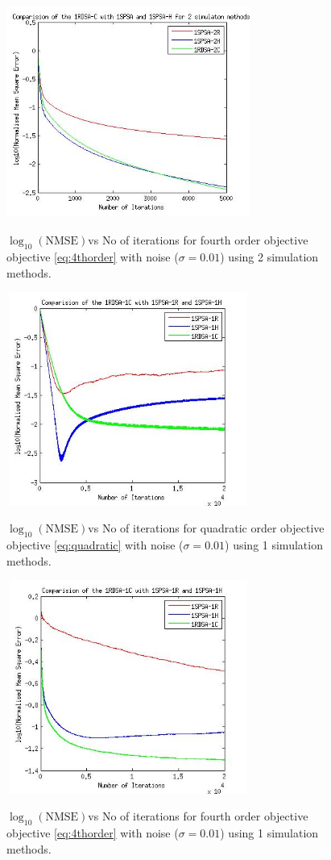 \begin{figure}
\caption{$\log_{10}(\text{NMSE})$vs No of iterations for fourth order objective 
objective \eqref{eq:4thorder} with noise ($\sigma=0.01$) using 2 simulation methods.}
\includegraphics[width=8cm, height=7cm]{results_noise_fourthorder.jpg}\label{fig:noise_4thorder}
\end{figure}

\begin{figure}
\caption{$\log_{10}(\text{NMSE})$vs No of iterations for quadratic order objective 
objective \eqref{eq:quadratic} with noise ($\sigma=0.01$) using 1 simulation methods.}
\includegraphics[width=8cm, height=7cm]{results_noise_1sim_quad.jpg}\label{fig:noise_quad_1sim}
\end{figure}

\begin{figure}
\caption{$\log_{10}(\text{NMSE})$vs No of iterations for fourth order objective 
objective \eqref{eq:4thorder} with noise ($\sigma=0.01$) using 1 simulation methods.}
\includegraphics[width=8cm, height=7cm]{results_noise_1sim_fourthorder.jpg}\label{fig:noise_4thorder_1sim}
\end{figure}

